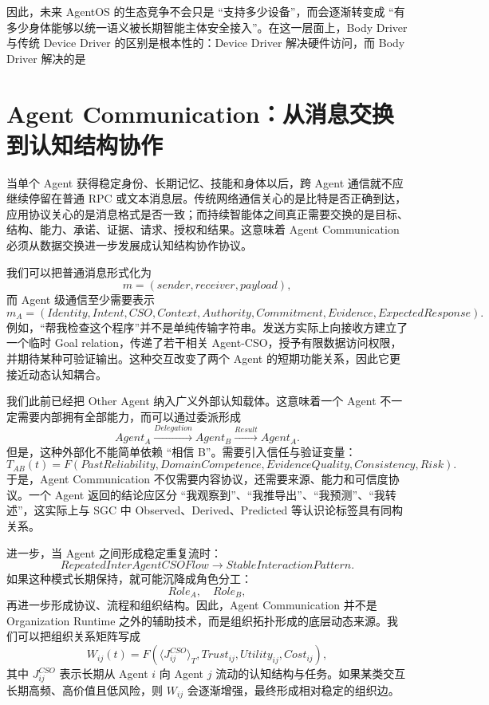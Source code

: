 因此，未来 AgentOS 的生态竞争不会只是 ``支持多少设备''，而会逐渐转变成 ``有多少身体能够以统一语义被长期智能主体安全接入''。在这一层面上，Body Driver 与传统 Device Driver 的区别是根本性的：Device Driver 解决硬件访问，而 Body Driver 解决的是
\begin{statementbox}
\centering
{}
\end{statementbox}

\section{Agent Communication：从消息交换到认知结构协作}

当单个 Agent 获得稳定身份、长期记忆、技能和身体以后，跨 Agent 通信就不应继续停留在普通 RPC 或文本消息层。传统网络通信关心的是比特是否正确到达，应用协议关心的是消息格式是否一致；而持续智能体之间真正需要交换的是目标、结构、能力、承诺、证据、请求、授权和结果。这意味着 Agent Communication 必须从数据交换进一步发展成认知结构协作协议。

我们可以把普通消息形式化为
\[
m=(sender,receiver,payload),
\]
而 Agent 级通信至少需要表示
\[
m_A=
(
Identity,
Intent,
CSO,
Context,
Authority,
Commitment,
Evidence,
ExpectedResponse
).
\]
例如，``帮我检查这个程序''并不是单纯传输字符串。发送方实际上向接收方建立了一个临时 Goal relation，传递了若干相关 Agent-CSO，授予有限数据访问权限，并期待某种可验证输出。这种交互改变了两个 Agent 的短期功能关系，因此它更接近动态认知耦合。

我们此前已经把 Other Agent 纳入广义外部认知载体。这意味着一个 Agent 不一定需要内部拥有全部能力，而可以通过委派形成
\[
Agent_A
\xrightarrow{Delegation}
Agent_B
\xrightarrow{Result}
Agent_A.
\]
但是，这种外部化不能简单依赖 ``相信 B''。需要引入信任与验证变量：
\[
T_{AB}(t)
=
F(
PastReliability,
DomainCompetence,
EvidenceQuality,
Consistency,
Risk
).
\]
于是，Agent Communication 不仅需要内容协议，还需要来源、能力和可信度协议。一个 Agent 返回的结论应区分 ``我观察到''、``我推导出''、``我预测''、``我转述''，这实际上与 SGC 中 Observed、Derived、Predicted 等认识论标签具有同构关系。

进一步，当 Agent 之间形成稳定重复流时：
\[
RepeatedInterAgentCSOFlow
\rightarrow
StableInteractionPattern.
\]
如果这种模式长期保持，就可能沉降成角色分工：
\[
Role_A,\quad Role_B,
\]
再进一步形成协议、流程和组织结构。因此，Agent Communication 并不是 Organization Runtime 之外的辅助技术，而是组织拓扑形成的底层动态来源。我们可以把组织关系矩阵写成
\[
W_{ij}(t)
=
F(
\langle J^{CSO}_{ij}\rangle_T,
Trust_{ij},
Utility_{ij},
Cost_{ij}
),
\]
其中 $J^{CSO}_{ij}$ 表示长期从 Agent $i$ 向 Agent $j$ 流动的认知结构与任务。如果某类交互长期高频、高价值且低风险，则 $W_{ij}$ 会逐渐增强，最终形成相对稳定的组织边。

